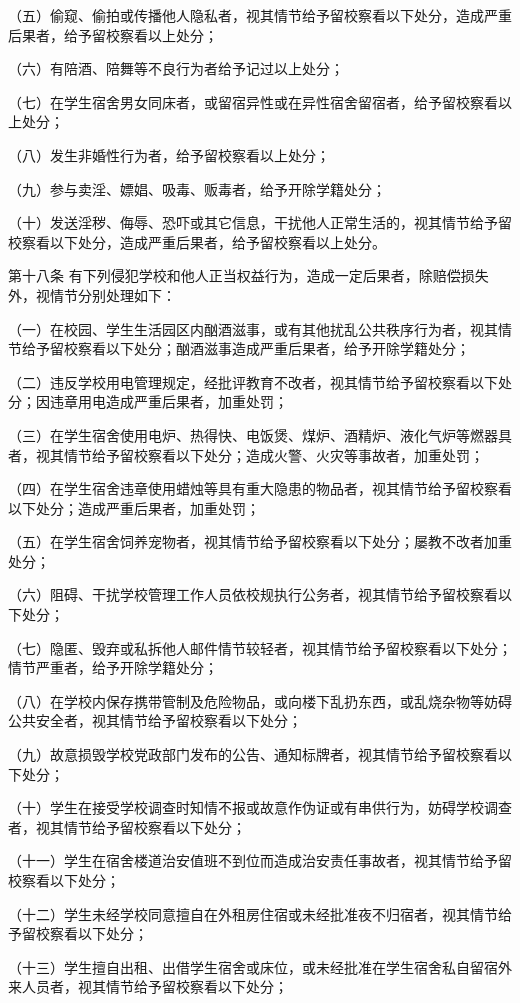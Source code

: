\documentclass[UTF8,12pt,a4paper]{report}
\begin{document}
（五）偷窥、偷拍或传播他人隐私者，视其情节给予留校察看以下处分，造成严重后果者，给予留校察看以上处分；

（六）有陪酒、陪舞等不良行为者给予记过以上处分；

（七）在学生宿舍男女同床者，或留宿异性或在异性宿舍留宿者，给予留校察看以上处分；

（八）发生非婚性行为者，给予留校察看以上处分；

（九）参与卖淫、嫖娼、吸毒、贩毒者，给予开除学籍处分；

（十）发送淫秽、侮辱、恐吓或其它信息，干扰他人正常生活的，视其情节给予留校察看以下处分，造成严重后果者，给予留校察看以上处分。

第十八条  有下列侵犯学校和他人正当权益行为，造成一定后果者，除赔偿损失外，视情节分别处理如下：

（一）在校园、学生生活园区内酗酒滋事，或有其他扰乱公共秩序行为者，视其情节给予留校察看以下处分；酗酒滋事造成严重后果者，给予开除学籍处分；

（二）违反学校用电管理规定，经批评教育不改者，视其情节给予留校察看以下处分；因违章用电造成严重后果者，加重处罚；

（三）在学生宿舍使用电炉、热得快、电饭煲、煤炉、酒精炉、液化气炉等燃器具者，视其情节给予留校察看以下处分；造成火警、火灾等事故者，加重处罚；

（四）在学生宿舍违章使用蜡烛等具有重大隐患的物品者，视其情节给予留校察看以下处分；造成严重后果者，加重处罚；

（五）在学生宿舍饲养宠物者，视其情节给予留校察看以下处分；屡教不改者加重处分；

（六）阻碍、干扰学校管理工作人员依校规执行公务者，视其情节给予留校察看以下处分；

（七）隐匿、毁弃或私拆他人邮件情节较轻者，视其情节给予留校察看以下处分；情节严重者，给予开除学籍处分；

（八）在学校内保存携带管制及危险物品，或向楼下乱扔东西，或乱烧杂物等妨碍公共安全者，视其情节给予留校察看以下处分；

（九）故意损毁学校党政部门发布的公告、通知标牌者，视其情节给予留校察看以下处分；

（十）学生在接受学校调查时知情不报或故意作伪证或有串供行为，妨碍学校调查者，视其情节给予留校察看以下处分；

（十一）学生在宿舍楼道治安值班不到位而造成治安责任事故者，视其情节给予留校察看以下处分；

（十二）学生未经学校同意擅自在外租房住宿或未经批准夜不归宿者，视其情节给予留校察看以下处分；

（十三）学生擅自出租、出借学生宿舍或床位，或未经批准在学生宿舍私自留宿外来人员者，视其情节给予留校察看以下处分；
\end{document}
